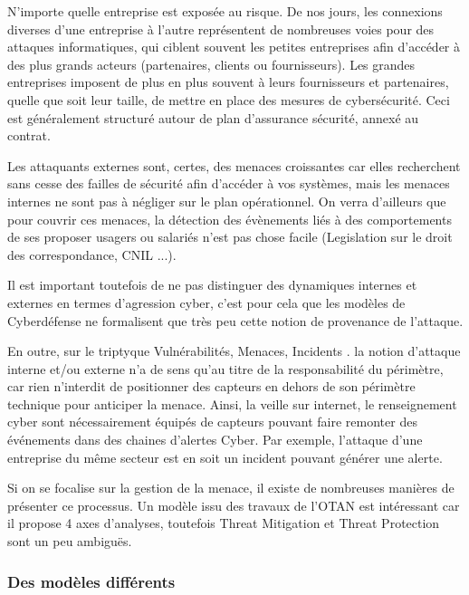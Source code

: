 N’importe quelle entreprise est exposée au risque. De nos jours, les connexions diverses d’une entreprise à l’autre représentent de nombreuses voies pour des attaques informatiques, qui ciblent souvent les petites entreprises afin d’accéder à des plus grands acteurs (partenaires,  clients ou fournisseurs). Les grandes entreprises imposent de plus en plus  souvent à leurs fournisseurs et partenaires, quelle que soit leur taille, de mettre en place des mesures de cybersécurité. Ceci est généralement structuré autour de plan d'assurance sécurité, annexé au contrat.

Les attaquants externes sont, certes, des menaces croissantes car elles recherchent sans cesse des failles de sécurité afin d’accéder à vos systèmes, mais les menaces internes ne sont  pas à négliger sur le plan opérationnel. On verra d'ailleurs que pour couvrir ces menaces, la détection des évènements liés à des comportements de ses proposer usagers ou salariés n'est pas chose facile (Legislation sur le droit des correspondance, CNIL ...).

Il est important toutefois de ne pas distinguer des dynamiques internes et externes en termes d'agression cyber, c'est pour cela que les modèles de Cyberdéfense ne formalisent que très peu cette notion de provenance de l'attaque.

En outre, sur le triptyque Vulnérabilités, Menaces, Incidents . la notion d'attaque interne et/ou externe n'a de sens qu'au titre de la responsabilité du périmètre, car rien n'interdit de positionner des capteurs en dehors de son périmètre technique pour anticiper la menace. Ainsi, la veille sur internet, le renseignement cyber sont nécessairement équipés de capteurs pouvant faire remonter des événements dans des chaines d'alertes Cyber.
Par exemple, l'attaque d'une entreprise du même secteur est en soit un incident pouvant générer une alerte.

Si on se focalise sur la gestion de la menace, il existe de nombreuses manières de présenter ce processus. Un modèle  issu des travaux de l'OTAN est intéressant car il propose 4 axes d'analyses, toutefois Threat Mitigation et Threat Protection sont un peu ambiguës.


\begin{frame}
\frametitle<presentation>{Des modèles différents}
\end{frame}

